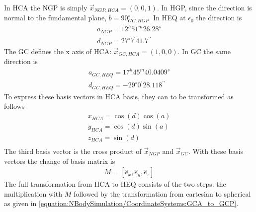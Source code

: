 \documentclass[letterpaper,10pt,english]{sphinxmanual}
\begin{document}
\sphinxAtStartPar
In HCA the NGP is simply \(\vec{x}_{NGP,HCA}=(0, 0, 1)\).
In HGP, since the direction is normal to the fundamental plane, \(b=90^{\circ}_{GC,HGP}\).
In HEQ at \(\epsilon_0\) the direction is
\begin{equation*}
\begin{split}a_{NGP} = 12^h51^m26.28^s \\
d_{NGP} = 27^{\circ}7^\prime41.7^{\prime\prime}\end{split}
\end{equation*}
\sphinxAtStartPar
The GC defines the x axis of HCA: \(\vec{x}_{GC,HCA}=(1, 0, 0)\). In GC the same direction is
\begin{equation*}
\begin{split}a_{GC,HEQ} = 17^h45^m40.0409^s \\
d_{GC,HEQ} = -29^{\circ}0^\prime28.118^{\prime\prime}\end{split}
\end{equation*}
\sphinxAtStartPar
To express these basis vectors in HCA basis, they can to be transformed as follows
\begin{equation*}
\begin{split}x_{HCA} = \cos(d)\cos(a) \\
y_{HCA} = \cos(d)\sin(a) \\
z_{HCA} = \sin(d) \\\end{split}
\end{equation*}
\sphinxAtStartPar
The third basis vector is the cross product of \(\vec{x}_{NGP}\) and \(\vec{x}_{GC}\).
With these basis vectors the change of basis matrix is
\begin{equation*}
\begin{split}M = \left [\hat{e}_x,\hat{e}_y,\hat{e}_z\right ]\end{split}
\end{equation*}
\sphinxAtStartPar
The full transformation from HCA to HEQ consists of the two steps: the multiplication with \(M\) followed by
the transformation from cartesian to spherical as given in \eqref{equation:NBodySimulation/CoordinateSystems:GCA_to_GCP}.
\end{document}

